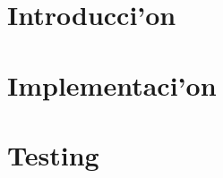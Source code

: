 \documentclass[spanish, a4paper, 10pt, titlepage]{article}
\author{Echevarr'ia - Farjat - Freijo - Giusto}
\begin{document}

\tableofcontents
\clearpage



\section{Introducci'on}

\clearpage

\section{Implementaci'on}

\clearpage

\section{Testing}

\clearpage

%
\end{document}
